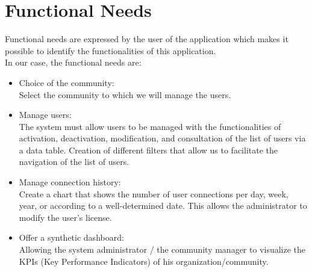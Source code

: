 \section{Functional Needs}
Functional needs are expressed by the user of the application
which makes it possible to identify the functionalities of this application.\\
In our
case, the functional needs are:
\begin{itemize}
\item Choice of the community:\\
Select the community to which we will manage the users.

\item Manage users:\\
The system must allow users to be managed with the functionalities of activation,
deactivation, modification, and consultation of the list of users via a data table.
Creation of different filters that allow us to facilitate the navigation of the list of users.

\item Manage connection history:\\
Create a chart that shows the number of user connections per day, week, year, or
according to a well-determined date. This allows the administrator to modify the user’s license.


\item Offer a synthetic dashboard:\\
Allowing the system administrator / the community manager to visualize the KPIs (Key Performance Indicators) of his organization/community.


\end{itemize}
